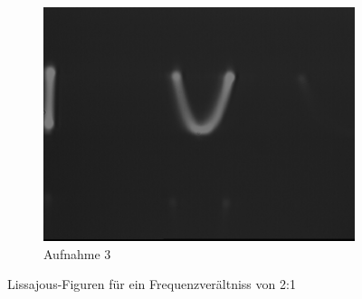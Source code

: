 \documentclass[bigchapter,colorback,accentcolor=tud4b,linedtoc,11pt]{tudreport}
\begin{document}
\begin{figure}[H]
\begin{subfigure}[h]{0.32\textwidth}
    \includegraphics[width=\textwidth]{data/Aufgabe7/2-1-y.png}
    \caption[Cap for listoffigures]{Aufnahme 3}
  \end{subfigure}%
  \caption{Lissajous-Figuren für ein Frequenzverältniss von 2:1}
\end{figure}
\end{document}
